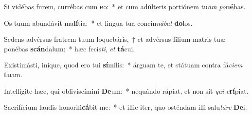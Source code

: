 \item Si vidébas furem, currébas cum \textbf{e}o:~* et cum adúlteris portiónem tu\textit{am} \textit{po}\textbf{né}bas.
\item Os tuum abundávit ma\textbf{lí}tia:~* et lingua tua concin\textit{ná}\textit{bat} \textbf{do}los.
\item Sedens advérsus fratrem tuum loquebáris,~† et advérsus fílium matris tuæ ponébas \textbf{scán}dalum:~* hæc fecís\textit{ti}, \textit{et} \textbf{tá}cui.
\item Existimásti, iníque, quod ero tui \textbf{sí}milis:~* árguam te, et státuam contra fá\textit{ci}\textit{em} \textbf{tu}am.
\item Intellígite hæc, qui obliviscímini \textbf{De}um:~* nequándo rápiat, et non sit \textit{qui} \textit{e}\textbf{rí}piat.
\item Sacrifícium laudis honorifi\textbf{cá}bit me:~* et illic iter, quo osténdam illi salu\textit{tá}\textit{re} \textbf{De}i.

